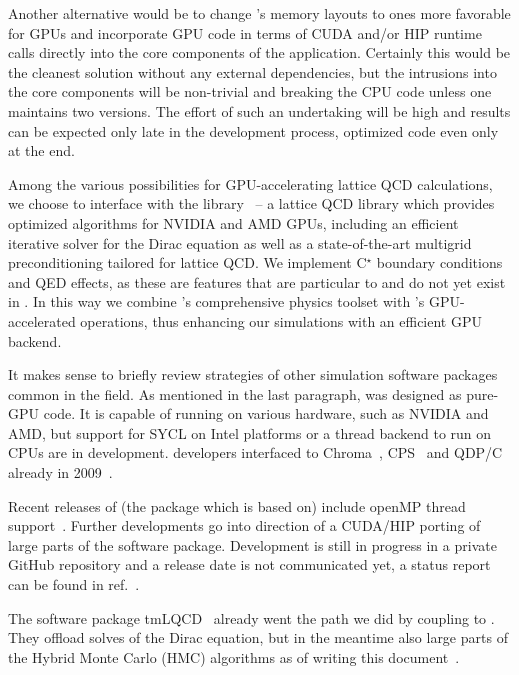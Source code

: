 Another alternative would be to change \openqxd's memory layouts to ones more favorable for GPUs and incorporate GPU code in terms of CUDA and/or HIP runtime calls directly into the core components of the application. Certainly this would be the cleanest solution without any external dependencies, but the intrusions into the core components will be non-trivial and breaking the CPU code unless one maintains two versions. The effort of such an undertaking will be high and results can be expected only late in the development process, optimized code even only at the end.

Among the various possibilities for GPU-accelerating lattice QCD calculations, we choose to interface \openqxd with the \quda library~\cite{QUDApaper,Babich:2011np,Clark:2016rdz} -- a lattice QCD library which provides optimized algorithms for NVIDIA and AMD GPUs, including an efficient iterative solver for the Dirac equation as well as a state-of-the-art multigrid preconditioning tailored for lattice QCD.
We implement C$^\star$ boundary conditions and QED effects, as these are features that are particular to \openqxd and do not yet exist in \quda.
In this way we combine \openqxd's comprehensive physics toolset with \quda's GPU-accelerated operations, thus enhancing our simulations with an efficient GPU backend.

It makes sense to briefly review strategies of other simulation software packages common in the field.
As mentioned in the last paragraph, \quda was designed as pure-GPU code.
It is capable of running on various hardware, such as NVIDIA and AMD, but support for SYCL on Intel platforms or a thread backend to run on CPUs are in development.
\Quda developers interfaced to Chroma~\cite{Edwards:2004sx,github:chroma}, CPS~\cite{online:cps} and QDP/C~\cite{online:qdpc} already in 2009~\cite{QUDApaper}.

Recent releases of \openqcd (the package which \openqxd is based on) include openMP thread support~\cite{online:openqcd}.
Further developments go into direction of a CUDA/HIP porting of large parts of the software package.
Development is still in progress in a private GitHub repository and a release date is not communicated yet, a status report can be found in ref.~\cite{online:openqcdongpu}.

The software package tmLQCD~\cite{jansen2009} already went the path we did by coupling to \quda.
They offload solves of the Dirac equation, but in the meantime also large parts of the Hybrid Monte Carlo (HMC) algorithms as of writing this document~\cite{Kostrzewa:2022,Finkenrath:2023,Garofalo:2025}.

